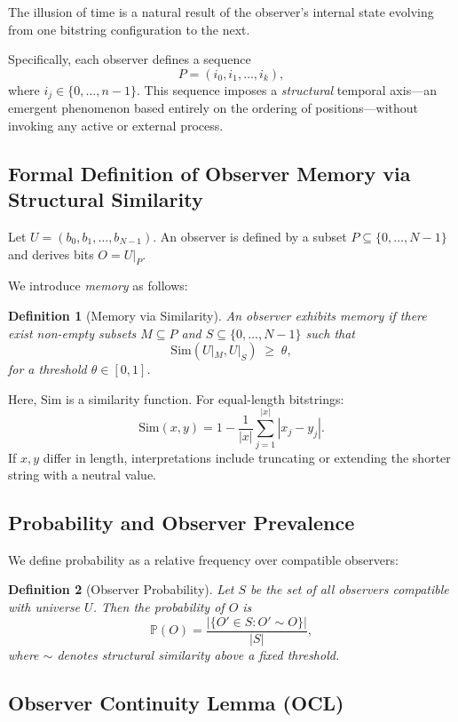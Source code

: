 \documentclass[11pt]{article}
\newtheorem{definition}{Definition}
\begin{document}
The illusion of time is a natural result of the observer’s internal state evolving from one bitstring configuration to the next.


Specifically, each observer defines a sequence
\[
    P = (i_0, i_1, \dots, i_k),
\]
where \(i_j \in \{0,\dots,n-1\}\). This sequence imposes a \emph{structural} temporal axis—an emergent phenomenon based entirely on the ordering of positions—without invoking any active or external process.

\subsection{Formal Definition of Observer Memory via Structural Similarity}

Let \(U = (b_0,b_1,\dots,b_{N-1})\). An observer is defined by a subset \(P\subseteq \{0,\dots,N-1\}\) and derives bits \(O = U|_P\).

We introduce \emph{memory} as follows:

\begin{definition}[Memory via Similarity]
    An observer exhibits memory if there exist non-empty subsets \(M\subseteq P\) and \(S\subseteq \{0,\dots,N-1\}\) such that
    \[
        \mathrm{Sim}(U|_M, U|_S)\;\ge\;\theta,
    \]
    for a threshold \(\theta\in[0,1]\).
\end{definition}

Here, \(\mathrm{Sim}\) is a similarity function. For equal-length bitstrings:
\[
    \mathrm{Sim}(x,y)=1-\frac1{|x|}\sum_{j=1}^{|x|} |x_j-y_j|.
\]
If \(x,y\) differ in length, interpretations include truncating or extending the shorter string with a neutral value.

\subsection{Probability and Observer Prevalence}

We define probability as a relative frequency over compatible observers:

\begin{definition}[Observer Probability]
    Let $S$ be the set of all observers compatible with universe $U$. Then the probability of $O$ is
    \[
        \mathbb{P}(O) = \frac{|\{O' \in S : O' \sim O\}|}{|S|},
    \]
    where $\sim$ denotes structural similarity above a fixed threshold.
\end{definition}

\subsection{Observer Continuity Lemma (OCL)}
\end{document}
